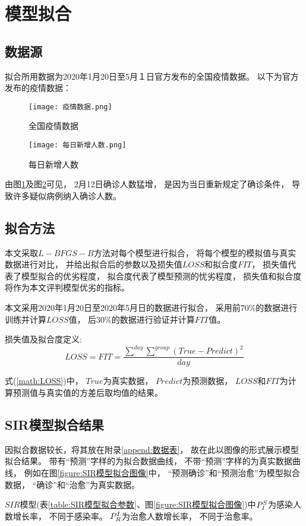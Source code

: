 \section{模型拟合}
\subsection{数据源}
\par 拟合所用数据为2020年1月20日至5月１日官方发布的全国疫情数据。
以下为官方发布的疫情数据：
\begin{figure}[H]
    \centering
    \texttt{[image: 疫情数据.png]}
    \caption{全国疫情数据\label{figure:全国疫情数据}}
\end{figure}
\begin{figure}[H]
    \centering
    \texttt{[image: 每日新增人数.png]}
    \caption{每日新增人数\label{figure:每日新增人数}}
\end{figure}
\par
由图\ref{figure:全国疫情数据}及图\ref{figure:每日新增人数}可见，
2月12日确诊人数猛增，
是因为当日重新规定了确诊条件，
导致许多疑似病例纳入确诊人数。
\subsection{拟合方法}
\par 本文采取$L-BFGS-B$方法对每个模型进行拟合，
将每个模型的模拟值与真实数据进行对比，
并给出拟合后的参数以及损失值$LOSS$和拟合度$FIT$，
损失值代表了模型拟合的优劣程度，
拟合度代表了模型预测的忧劣程度，
损失值和拟合度将作为本文评判模型优劣的指标。
\par 本文采用2020年1月20日至2020年5月日的数据进行拟合，
采用前$70\%$的数据进行训练并计算$LOSS$值，
后$30\%$的数据进行验证并计算$FIT$值。
\par 损失值及拟合度定义:
\begin{equation}
    LOSS= FIT = \frac{\sum\limits^{day}\sum\limits^{group}
        (True-Predict)^2}{day}
    \label{math:LOSS}
\end{equation}
\par 式(\ref{math:LOSS})中，
$True$为真实数据，
$Predict$为预测数据，
$LOSS$和$FIT$为计算预测值与真实值的方差后取均值的结果。
\subsection{SIR模型拟合结果}
\par 因拟合数据较长，将其放在附录\ref{append:数据表}，
故在此以图像的形式展示模型拟合结果。
带有“预测”字样的为拟合数据曲线，
不带“预测”字样的为真实数据曲线，
例如在图\ref{figure:SIR模型拟合图像}中，
“预测确诊”和“预测治愈”为模型拟合数据，
“确诊”和“治愈”为真实数据。
\par $SIR$模型(表\ref{table:SIR模型拟合参数}、图\ref{figure:SIR模型拟合图像})中$\P{S}{I}$为感染人数增长率，
不同于感染率。
$\P{I}{R}$为治愈人数增长率，
不同于治愈率。
